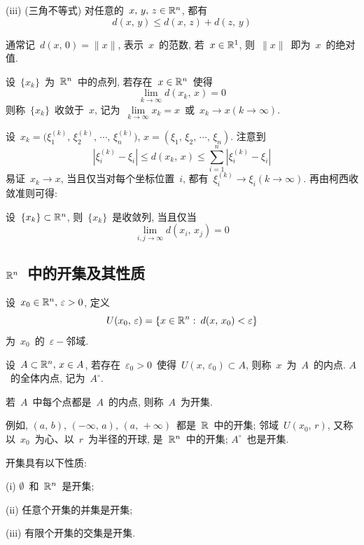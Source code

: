 (iii) (三角不等式) 对任意的~$x,\,y,\,z \in \mathbb{R}^n$, 都有
\[
d(x,\,y) \leqslant d(x,\,z) + d(z,\,y)
\]

通常记~$d(x,\,0) = \|x\|$, 表示~$x$~的范数, 若~$x \in \mathbb{R}^1$, 则~$\|x\|$~即为~$x$~的绝对值.

\begin{definition}
设~$\{x_k\}$~为~$\mathbb{R}^n$~中的点列, 若存在~$x \in \mathbb{R}^n$~使得
\[
\lim_{k \to \infty} d(x_k, \, x) = 0
\]
则称~$\{x_k\}$~收敛于~$x$, 记为~$\lim\limits_{k \to \infty} x_k = x$~或~$x_k \rightarrow x(k \to \infty)$.
\end{definition}

设~$x_k = \big(\xi_1 ^{(k)}, \, \xi_2 ^{(k)}, \, \cdots, \, \xi_n ^{(k)}\big), \, x = (\xi_1,\,\xi_2,\, \cdots, \, \xi_n)$. 注意到
\[
|\xi_i ^{(k)} - \xi_i| \leqslant d(x_k,\,x) \leqslant \sum_{i = 1}^n |\xi_i ^{(k)} - \xi_i|
\]
易证~$x_k \rightarrow x$, 当且仅当对每个坐标位置~$i$, 都有~$\xi_i ^{(k)} \rightarrow \xi_i(k \to \infty)$. 再由柯西收敛准则可得:

\begin{proposition}
设~$\{x_k\} \subset \mathbb{R}^n$, 则~$\{x_k\}$~是收敛列, 当且仅当
\[
\lim_{i,j \to \infty} d(x_i,\,x_j) = 0
\]
\end{proposition}

\subsection{$\mathbb{R}^n$~中的开集及其性质}

\begin{definition}
设~$x_0 \in \mathbb{R}^n, \, \varepsilon > 0$, 定义
\[
U(x_0,\,\varepsilon) = \{x \in \mathbb{R}^n: \: d(x,\, x_0) < \varepsilon\}
\]
为~$x_0$~的~$\varepsilon-$邻域.

设~$A \subset \mathbb{R}^n, \, x \in A$, 若存在~$\varepsilon_0 > 0$~使得~$U(x,\,\varepsilon_0) \subset A$, 则称~$x$~为~$A$~的内点. $A$~的全体内点, 记为~$A^\circ$.

若~$A$~中每个点都是~$A$~的内点, 则称~$A$~为开集.
\end{definition}

例如, $(a, \, b), \, (-\infty, \, a), \, (a, \, +\infty)$~都是~$\mathbb{R}$~中的开集; 邻域~$U(x_0,\,r)$, 又称以~$x_0$~为心、以~$r$~为半径的开球, 是~$\mathbb{R}^n$~中的开集; $A^\circ$~也是开集.

\begin{proposition} \label{prop1.4.2}
开集具有以下性质:


(i) $\emptyset$~和~$\mathbb{R}^n$~是开集;

(ii) 任意个开集的并集是开集;

(iii) 有限个开集的交集是开集.
\end{proposition}

